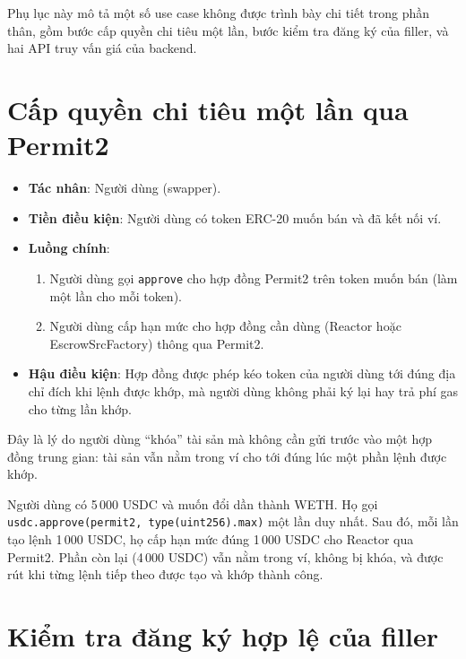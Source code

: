 \documentclass[../DoAn.tex]{subfiles}
\begin{document}
Phụ lục này mô tả một số use case không được trình bày chi tiết trong phần thân, gồm bước cấp quyền chi tiêu một lần, bước kiểm tra đăng ký của filler, và hai API truy vấn giá của backend.

\section{Cấp quyền chi tiêu một lần qua Permit2}

\begin{itemize}
    \item \textbf{Tác nhân}: Người dùng (swapper).
    \item \textbf{Tiền điều kiện}: Người dùng có token ERC-20 muốn bán và đã kết nối ví.
    \item \textbf{Luồng chính}:
    \begin{enumerate}
        \item Người dùng gọi \texttt{approve} cho hợp đồng Permit2 trên token muốn bán (làm một lần cho mỗi token).
        \item Người dùng cấp hạn mức cho hợp đồng cần dùng (Reactor hoặc EscrowSrcFactory) thông qua Permit2.
    \end{enumerate}
    \item \textbf{Hậu điều kiện}: Hợp đồng được phép kéo token của người dùng tới đúng địa chỉ đích khi lệnh được khớp, mà người dùng không phải ký lại hay trả phí gas cho từng lần khớp.
\end{itemize}

Đây là lý do người dùng ``khóa'' tài sản mà không cần gửi trước vào một hợp đồng trung gian: tài sản vẫn nằm trong ví cho tới đúng lúc một phần lệnh được khớp.

\begin{example}
Người dùng có 5\,000 USDC và muốn đổi dần thành WETH. Họ gọi \texttt{usdc.approve(permit2, type(uint256).max)} một lần duy nhất. Sau đó, mỗi lần tạo lệnh 1\,000 USDC, họ cấp hạn mức đúng 1\,000 USDC cho Reactor qua Permit2. Phần còn lại (4\,000 USDC) vẫn nằm trong ví, không bị khóa, và được rút khi từng lệnh tiếp theo được tạo và khớp thành công.
\end{example}

\section{Kiểm tra đăng ký hợp lệ của filler}
\end{document}
